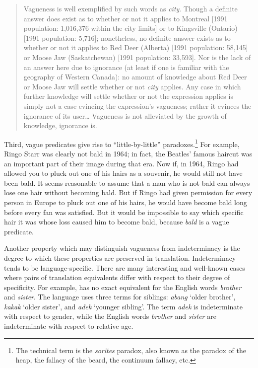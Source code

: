 \begin{quote}
Vagueness is well exemplified by such words as \textit{city}. Though a definite answer does exist as to whether or not it applies to Montreal [1991 population: 1,016,376 within the city limits] or to Kingsville (Ontario) [1991 population: 5,716]; nonetheless, no definite answer exists as to whether or not it applies to Red Deer (Alberta) [1991 population: 58,145] or Moose Jaw (Saskatchewan) [1991 population: 33,593]. Nor is the lack of an answer here due to ignorance (at least if one is familiar with the geography of Western Canada): no amount of knowledge about Red Deer or Moose Jaw will settle whether or not \textit{city} applies. Any case in which further knowledge will settle whether or not the expression applies is simply not a case evincing the expression’s vagueness; rather it evinces the ignorance of its user… Vagueness is not alleviated by the growth of knowledge, ignorance is.
\end{quote}


Third, vague predicates give rise to “little-by-little” paradoxes.\footnote{The technical term is the \textit{sorites} paradox, also known as the paradox of the heap, the fallacy of the beard, the continuum fallacy, etc.} For example, Ringo Starr was clearly not bald in 1964; in fact, the Beatles’ famous haircut was an important part of their image during that era. Now if, in 1964, Ringo had allowed you to pluck out one of his hairs as a souvenir, he would still not have been bald. It seems reasonable to assume that a man who is not bald can always lose one hair without becoming bald. But if Ringo had given permission for every person in Europe to pluck out one of his hairs, he would have become bald long before every fan was satisfied. But it would be impossible to say which specific hair it was whose loss caused him to become bald, because \textit{bald} is a vague predicate.



Another property which may distinguish vagueness from indeterminacy is the degree to which these properties are preserved in translation. Indeterminacy tends to be language-specific. There are many interesting and well-known cases where pairs of translation equivalents differ with respect to their degree of specificity. For example,  has no exact equivalent for the English words \textit{brother} and \textit{sister}. The language uses three terms for siblings: \textit{abang} ‘older brother’, \textit{kakak} ‘older sister’, and \textit{adek} ‘younger sibling’. The term \textit{adek} is indeterminate with respect to gender, while the English words \textit{brother} and \textit{sister} are indeterminate with respect to relative age.



